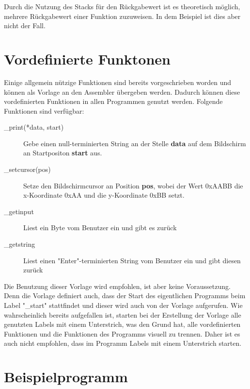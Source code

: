 Durch die Nutzung des Stacks für den Rückgabewert ist es theoretisch möglich,
mehrere Rückgabewert einer Funktion zuzuweisen. In dem Beispiel ist dies aber
nicht der Fall.
\section{Vordefinierte Funktonen}
Einige allgemein nützige Funktionen sind bereits vorgeschrieben worden und
können als Vorlage an den Assembler übergeben werden. Dadurch können diese
vordefinierten Funktionen in allen Programmen genutzt werden. Folgende
Funktionen sind verfügbar:
\begin{description}
\item [\_print(*data, start)] Gebe einen null-terminierten String an der
Stelle \textbf{data} auf dem Bildschirm an Startpositon \textbf{start}
aus.
\item [\_setcursor(pos)] Setze den Bildschirmcursor an Position \textbf{pos},
	wobei der Wert 0xAABB die x-Koordinate 0xAA und die y-Koordinate 0xBB setzt.
\item [\_getinput] Liest ein Byte vom Benutzer ein und gibt es zurück
\item [\_getstring] Liest einen "Enter"-terminierten String vom Benutzer ein und
	gibt diesen zurück
\end{description}
Die Benutzung dieser Vorlage wird empfohlen, ist aber keine Voraussetzung. Denn
die Vorlage definiert auch, dass der Start des eigentlichen Programms beim Label
"\_start" stattfindet und dieser wird auch von der Vorlage aufgerufen. Wie
wahrscheinlich bereits aufgefallen ist, starten bei der Erstellung der Vorlage
alle genutzten Labels mit einem Unterstrich, was den Grund hat, alle
vordefinierten Funktionen und die Funktionen des Programms visuell zu trennen.
Daher ist es auch nicht empfohlen, dass im Programm Labels mit einem Unterstrich
starten.
\pagebreak
\section{Beispielprogramm}
